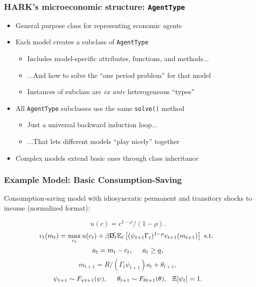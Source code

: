 \documentclass[11pt,handout]{beamer}
\newcommand{\E}{\mathbb{E}}
\newcommand{\bi}{\begin{itemize}}
\newcommand{\ei}{\end{itemize}}
\newcommand{\Die}{\mathsf{D}}
\newcommand{\Live}{\cancel{\Die}}
\begin{document}
\begin{frame}
\frametitle{HARK's microeconomic structure: \texttt{AgentType}}
\bi
\item <1->General purpose class for representing economic agents

\item<1-> Each model creates a subclass of \texttt{AgentType}
\bi
\item Includes model-specific attributes, functions, and methods...

\item ...And how to solve the ``one period problem'' for that model

\item Instances of subclass are \textit{ex ante} heterogeneous ``types''
\ei
\item <2-> All \texttt{AgentType} subclasses use the same \texttt{solve()} method
\bi
\item Just a universal backward induction loop...

\item ...That lets different models ``play nicely'' together
\ei
\item <3->Complex models extend basic ones through class inheritance
\ei
\end{frame}



\begin{frame}
\frametitle{Example Model: Basic Consumption-Saving}

Consumption-saving model with idiosyncratic permanent and transitory shocks to income (normalized format):

\begin{equation*}
u(c) = c^{1-\rho}/(1-\rho).
\end{equation*}
\begin{equation*}
v_t(m_t) = \max_{c_t} u(c_t) + \beta \Live_t \E_t \left[(\psi_{t+1} \Gamma_t)^{1-\rho} v_{t+1}(m_{t+1}) \right] \text{ s.t. }
\end{equation*}
\begin{equation*}
a_t = m_t - c_t, \hspace{0.5cm} a_t \geq \underline{a},
\end{equation*}
\begin{equation*}
m_{t+1} = R/(\Gamma_t \psi_{t+1}) a_t + \theta_{t+1}, 
\end{equation*}
\begin{equation*}
\psi_{t+1} \sim F_{\psi t+1}(\psi), \hspace{0.5cm} \theta_{t+1} \sim F_{\theta t+1}(\theta), \hspace{0.25cm} \E[\psi_t] = 1.
\end{equation*}
\end{frame}
\end{document}
